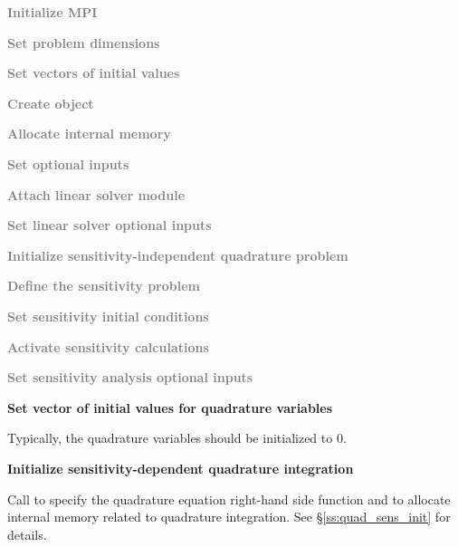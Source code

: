 \begin{Steps}
  
\item 
  \textcolor{gray}{\bf {\p} Initialize MPI}

\item
  \textcolor{gray}{\bf Set problem dimensions}

\item
  \textcolor{gray}{\bf Set vectors of initial values}
 
\item
  \textcolor{gray}{\bf Create {\idas} object}

\item
  \textcolor{gray}{\bf Allocate internal memory}

\item
  \textcolor{gray}{\bf Set optional inputs}

\item
  \textcolor{gray}{\bf Attach linear solver module}

\item
  \textcolor{gray}{\bf Set linear solver optional inputs}

\item
  \textcolor{gray}{\bf Initialize sensitivity-independent quadrature problem}

\item\label{i:quad_sens_sens_def}
  \textcolor{gray}{\bf Define the sensitivity problem}

\item
  \textcolor{gray}{\bf Set sensitivity initial conditions}

\item
  \textcolor{gray}{\bf Activate sensitivity calculations}

\item
  \textcolor{gray}{\bf Set sensitivity analysis optional inputs}

\item
  {\bf Set vector of initial values for quadrature variables}

  Typically, the quadrature variables should be initialized to $0$.

\item\label{i:quad_sens_init}
  {\bf Initialize sensitivity-dependent quadrature integration}

  Call  to specify the quadrature equation right-hand
  side function and to allocate internal memory related to quadrature integration. 
  See \S\ref{ss:quad_sens_init} for details.


\end{Steps}
